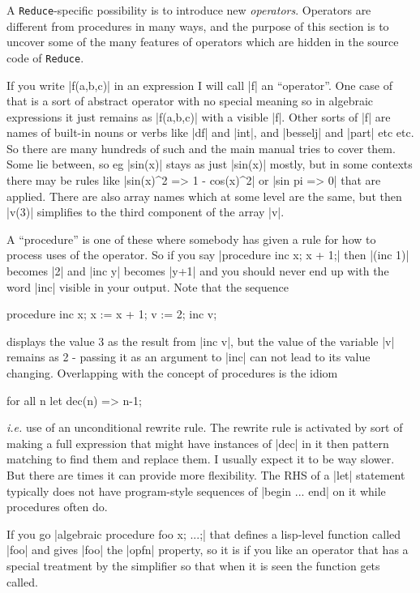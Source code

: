 \documentclass[12pt,twoside,openright]{memoir}
\newcommand{\reduce}{\texttt{Reduce}\xspace}
\begin{document}
A \reduce-specific possibility is to introduce new \emph{operators}. Operators
are different from procedures in many ways, and the purpose of this section is
to uncover some of the many features of operators which are hidden in the
source code of \reduce.

If you write |f(a,b,c)| in an expression I will call |f| an ``operator''. One
case of that is a sort of abstract operator with no special meaning so in
algebraic expressions it just remains as |f(a,b,c)| with a visible |f|. Other
sorts of |f| are names of built-in nouns or verbs like |df| and |int|, and
|besselj| and |part| etc etc. So there are many hundreds of such and the main
manual tries to cover them. Some lie between, so eg |sin(x)| stays as just
|sin(x)| mostly, but in some contexts there may be rules like
|sin(x)^2 => 1 - cos(x)^2| or |sin pi => 0|
that are applied. There are also array names which at some level are the same,
but then |v(3)| simplifies to the third component of the array |v|.

A ``procedure'' is one of these where somebody has given a rule for how to
process uses of the operator. So if you say |procedure inc x; x + 1;| then
|(inc 1)| becomes |2| and |inc y| becomes |y+1| and you should never end up
with the word |inc| visible in your output. Note that the sequence
\begin{rlispverb}
  procedure inc x; x := x + 1;
  v := 2;
  inc v;
\end{rlispverb}
displays the value 3 as the result from |inc v|, but the value of the
variable |v| remains as 2 - passing it as an argument to |inc| can not
lead to its value changing.
Overlapping with the concept of procedures is the idiom
\begin{rlispverb}
  for all n let dec(n) => n-1;
\end{rlispverb}
\emph{i.e.} use of an unconditional rewrite rule. The rewrite rule is activated
by sort of making a full expression that might have instances of |dec| in it
then pattern matching to find them and replace them. I usually expect it to be
way slower. But there are times it can provide more flexibility. The RHS of a
|let| statement typically does not have program-style sequences of
|begin ... end| on it while procedures often do.

If you go |algebraic procedure foo x; ...;| that defines a lisp-level function
called |foo| and gives |foo| the |opfn| property, so it is if you like an
operator that has a special treatment by the simplifier so that when it is seen
the function gets called.
\end{document}
